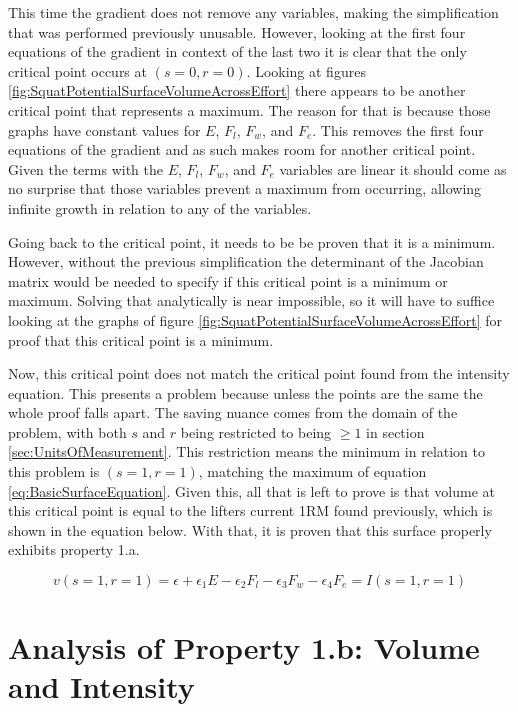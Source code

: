 This time the gradient does not remove any variables, making the simplification that was performed previously unusable. However, looking at the first four equations of the gradient in context of the last two it is clear that the only critical point occurs at $(s=0,r=0)$. Looking at figures \ref{fig:SquatPotentialSurfaceVolumeAcrossEffort} there appears to be another critical point that represents a maximum. The reason for that is because those graphs have constant values for $E$, $F_l$, $F_w$, and $F_e$. This removes the first four equations of the gradient and as such makes room for another critical point. Given the terms with the $E$, $F_l$, $F_w$, and $F_e$ variables are linear it should come as no surprise that those variables prevent a maximum from occurring, allowing infinite growth in relation to any of the variables.

Going back to the critical point, it needs to be be proven that it is a minimum. However, without the previous simplification the determinant of the Jacobian matrix would be needed to specify if this critical point is a minimum or maximum. Solving that analytically is near impossible, so it will have to suffice looking at the graphs of figure \ref{fig:SquatPotentialSurfaceVolumeAcrossEffort} for proof that this critical point is a minimum. 

Now, this critical point does not match the critical point found from the intensity equation. This presents a problem because unless the points are the same the whole proof falls apart. The saving nuance comes from the domain of the problem, with both $s$ and $r$ being restricted to being $\ge 1$ in section \ref{sec:UnitsOfMeasurement}. This restriction means the minimum in relation to this problem is $(s=1,r=1)$, matching the maximum of equation \ref{eq:BasicSurfaceEquation}. Given this, all that is left to prove is that volume at this critical point is equal to the lifters current 1RM found previously, which is shown in the equation below. With that, it is proven that this surface properly exhibits property 1.a.

\begin{equation}
	v(s=1,r=1)=
    			\epsilon+
    			\epsilon_1 E-
    			\epsilon_2 F_l-
    			\epsilon_3 F_w-
    			\epsilon_4 F_e = I(s=1,r=1)
\end{equation}

\section{Analysis of Property 1.b: Volume and Intensity}
\label{sec:PotentialSurfaceAnalysisOfProperty1b}

